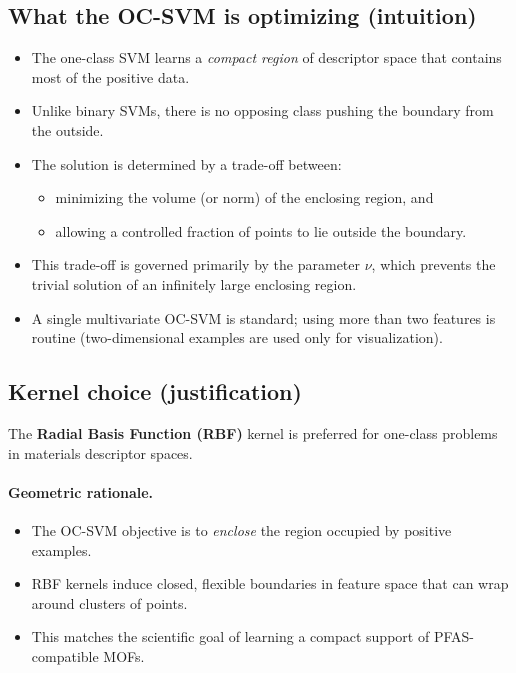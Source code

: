 \documentclass[11pt]{article}
\begin{document}
\subsection{What the OC-SVM is optimizing (intuition)}

\begin{itemize}
\item The one-class SVM learns a \emph{compact region} of descriptor space that contains most of the positive data.
\item Unlike binary SVMs, there is no opposing class pushing the boundary from the outside.
\item The solution is determined by a trade-off between:
\begin{itemize}
\item minimizing the volume (or norm) of the enclosing region, and
\item allowing a controlled fraction of points to lie outside the boundary.
\end{itemize}
\item This trade-off is governed primarily by the parameter $\nu$, which prevents the trivial solution of an infinitely large enclosing region.
\item A single multivariate OC-SVM is standard; using more than two features is routine (two-dimensional examples are used only for visualization).
\end{itemize}

\subsection{Kernel choice (justification)}

The \textbf{Radial Basis Function (RBF)} kernel is preferred for one-class problems in materials descriptor spaces.

\paragraph{Geometric rationale.}
\begin{itemize}
\item The OC-SVM objective is to \emph{enclose} the region occupied by positive examples.
\item RBF kernels induce closed, flexible boundaries in feature space that can wrap around clusters of points.
\item This matches the scientific goal of learning a compact support of PFAS-compatible MOFs.
\end{itemize}
\end{document}
